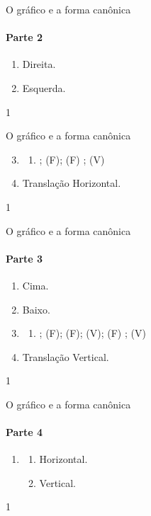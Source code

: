 \begin{answer}{O gráfico e a forma canônica}
{
\paragraph{Parte 2}

\begin{enumerate}
\item {} 
Direita.

\item {} 
Esquerda.
\end{enumerate}
}{1}
\end{answer}
\clearmargin
\marginpar{\vspace{.5em}}
\begin{answer}{O gráfico e a forma canônica}
{
\begin{enumerate}\setcounter{enumi}{2}
\item {} 
\begin{enumerate}
\item {} 
; (F); (F) ; (V)
\end{enumerate}
\item {} 
Translação Horizontal.
\end{enumerate}
}{1}
\end{answer}
\clearmargin
\marginpar{\vspace{.5em}}
\begin{answer}{O gráfico e a forma canônica}
{
\paragraph{Parte 3}
\begin{enumerate}
\item {} 
Cima.

\item {} 
Baixo.

\item {} 

\begin{enumerate}
\item {} 
; (F); (F); (V); (F) ; (V)
\end{enumerate}
\item {} 
Translação Vertical.
\end{enumerate}
}{1}
\end{answer}
\clearmargin
\clearmargin
\marginpar{\vspace{.5em}}
\begin{answer}{O gráfico e a forma canônica}
{
\paragraph{Parte 4}
\begin{enumerate}
\item 
\begin{enumerate}[label=\titem{\roman*)}]
\item Horizontal.
\item Vertical.
\end{enumerate}
\end{enumerate}
}{1}
\end{answer}
